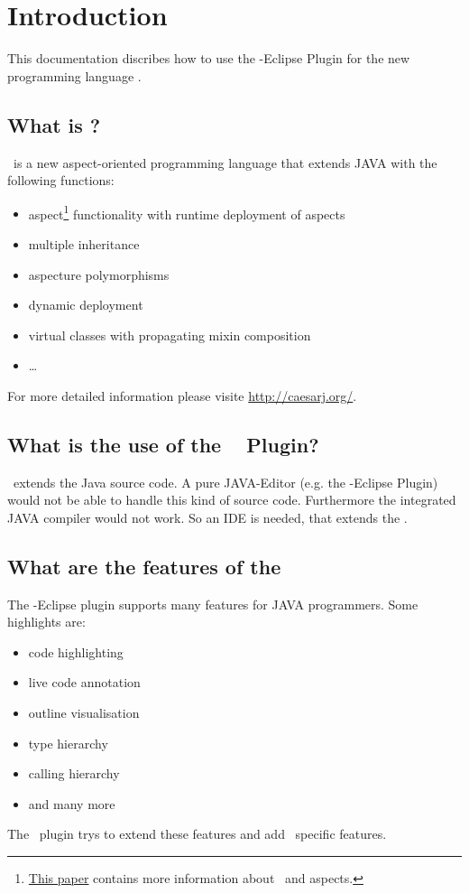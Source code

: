 \section{Introduction}
This documentation discribes how to use the \caesarj -Eclipse Plugin for the new programming language \caesarj.
\subsection{What is \caesarj ?}
\caesar ~is a new aspect-oriented programming language that extends JAVA with the following functions:
\begin{itemize}
	\item aspect\footnote{\href{http://www.st.informatik.tu-darmstadt.de/database/publications/data/aosd03.pdf?id=70}{This paper} contains more information about \caesarj ~and aspects.} functionality with runtime deployment of aspects
	\item multiple inheritance
	\item aspecture polymorphisms
	\item dynamic deployment
	\item virtual classes with propagating mixin composition
	\item \dots
\end{itemize}
For more detailed information please visite \href{http://caesarj.org/}{http://caesarj.org/}.

\subsection{What is the use of the \caesarj ~ Plugin?}
\caesarj ~extends the Java source code. A pure JAVA-Editor (e.g. the \jdt -Eclipse Plugin) would not be able to handle this kind of source code. Furthermore the integrated JAVA compiler would not work. So an IDE is needed, that extends the \jdt. 
\subsection{What are the features of the \jdt}
The \jdt -Eclipse plugin supports many features for JAVA programmers. Some highlights are:
\begin{itemize}
	\item code highlighting
	\item live code annotation 
	\item outline visualisation
	\item type hierarchy
	\item calling hierarchy
	\item and many more
\end{itemize}
The \caesarj ~plugin trys to extend these features and add \caesarj ~specific features.

